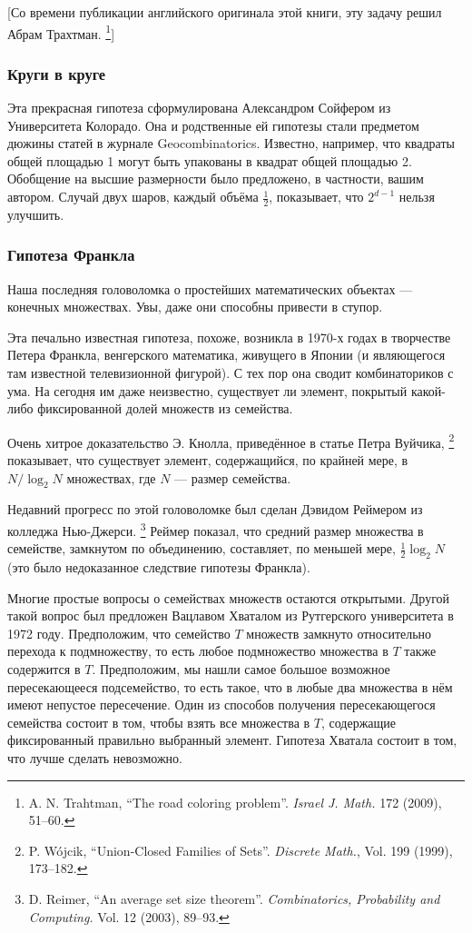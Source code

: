 [Со времени публикации английского оригинала этой книги, эту задачу решил Абрам Трахтман.%
\footnote{A. N. Trahtman, 
``The road coloring problem''.
\emph{Israel J. Math.} 172 (2009), 51--60.}]


\subsubsection*{Круги в круге}

Эта прекрасная гипотеза сформулирована Александром Сойфером из Университета Колорадо.
Она и родственные ей гипотезы стали предметом дюжины статей в журнале Geocombinatorics.
Известно, например, что квадраты общей площадью 1 могут быть упакованы в квадрат общей площадью 2.
Обобщение на высшие размерности было предложено, в частности, вашим автором.
Случай двух шаров, каждый объёма $\tfrac12$, показывает, что $2^{d-1}$ нельзя улучшить.

\subsubsection*{Гипотеза Франкла}

Наша последняя головоломка о простейших математических объектах --- конечных множествах.
Увы, даже они способны привести в ступор.

Эта печально известная гипотеза, похоже, возникла в 1970-х годах в творчестве Петера Франкла, венгерского математика, живущего в Японии (и являющегося там известной телевизионной фигурой).
С тех пор она сводит комбинаториков с ума. 
На сегодня им даже неизвестно, существует ли элемент, покрытый какой-либо фиксированной долей множеств из семейства.

Очень хитрое доказательство Э. Кнолла, приведённое в статье Петра Вуйчика,%
\footnote{P. W\'{o}jcik, ``Union-Closed Families of Sets''. \emph{Discrete Math.}, Vol. 199 (1999), 173--182.}
показывает, что существует элемент, содержащийся, по крайней мере, в $N/\log_2 N$ множествах, где $N$ --- размер семейства.

Недавний прогресс по этой головоломке был сделан Дэвидом Реймером из колледжа Нью-Джерси.%
\footnote{D. Reimer, ``An average set size theorem''. \emph{Combinatorics, Probability and Computing.} Vol. 12 (2003), 89--93.}
Реймер показал, что средний размер множества в семействе, замкнутом по объединению, составляет, по меньшей мере, $\tfrac12\log_2N$ (это было недоказанное следствие гипотезы Франкла).

Многие простые вопросы о семействах множеств остаются открытыми.
Другой такой вопрос был предложен Вацлавом Хваталом из Рутгерского университета в 1972 году.
Предположим, что семейство $T$ множеств замкнуто относительно перехода к подмножеству, то есть любое подмножество множества в $T$ также содержится в $T$.
Предположим, мы нашли самое большое возможное пересекающееся подсемейство, то есть такое, что в любые два множества в нём имеют непустое пересечение.
Один из способов получения пересекающегося семейства состоит в том, чтобы взять все множества в $T$, содержащие фиксированный правильно выбранный элемент.
Гипотеза Хватала состоит в том, что лучше сделать невозможно.
